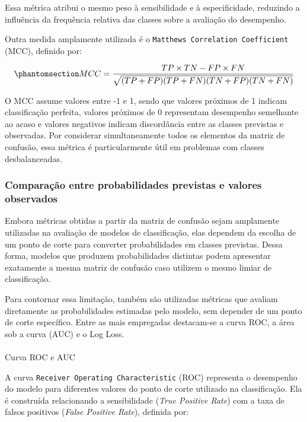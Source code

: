 \documentclass[
  brazilian,
  12pt,
  letterpaper,
  DIV=11,
  numbers=noendperiod]{scrartcl}
\makeatletter
\let\oldparagraph\paragraph
\renewcommand{\paragraph}{
    \@ifstar
      \xxxParagraphStar
      \xxxParagraphNoStar
  }
\newcommand{\xxxParagraphStar}[1]{\oldparagraph*{#1}\mbox{}}
\newcommand{\xxxParagraphNoStar}[1]{\oldparagraph{#1}\mbox{}}
\makeatother
\begin{document}
Essa métrica atribui o mesmo peso à sensibilidade e à especificidade,
reduzindo a influência da frequência relativa das classes sobre a
avaliação do desempenho.

Outra medida amplamente utilizada é o
\texttt{Matthews\ Correlation\ Coefficient} (MCC), definido por:

\begin{equation}\protect\phantomsection\label{eq-mcc}{
MCC=
\frac{TP\times TN-FP\times FN}
{\sqrt{(TP+FP)(TP+FN)(TN+FP)(TN+FN)}}
}\end{equation}

O MCC assume valores entre -1 e 1, sendo que valores próximos de 1
indicam classificação perfeita, valores próximos de 0 representam
desempenho semelhante ao acaso e valores negativos indicam discordância
entre as classes previstas e observadas. Por considerar simultaneamente
todos os elementos da matriz de confusão, essa métrica é particularmente
útil em problemas com classes desbalanceadas.

\subsubsection{Comparação entre probabilidades previstas e valores
observados}\label{comparauxe7uxe3o-entre-probabilidades-previstas-e-valores-observados}

Embora métricas obtidas a partir da matriz de confusão sejam amplamente
utilizadas na avaliação de modelos de classificação, elas dependem da
escolha de um ponto de corte para converter probabilidades em classes
previstas. Dessa forma, modelos que produzem probabilidades distintas
podem apresentar exatamente a mesma matriz de confusão caso utilizem o
mesmo limiar de classificação.

Para contornar essa limitação, também são utilizadas métricas que
avaliam diretamente as probabilidades estimadas pelo modelo, sem
depender de um ponto de corte específico. Entre as mais empregadas
destacam-se a curva ROC, a área sob a curva (AUC) e o Log Loss.

\paragraph{Curva ROC e AUC}\label{curva-roc-e-auc}

A curva \texttt{Receiver\ Operating\ Characteristic} (ROC) representa o
desempenho do modelo para diferentes valores do ponto de corte utilizado
na classificação. Ela é construída relacionando a sensibilidade
(\emph{True Positive Rate}) com a taxa de falsos positivos (\emph{False
Positive Rate}), definida por:
\end{document}
